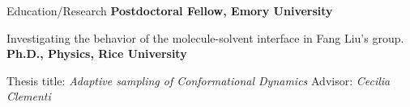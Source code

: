 \begin{rubric}{Education/Research}
%
	\textbf{Postdoctoral Fellow, Emory University}
  \par Investigating the behavior of the molecule-solvent interface in Fang Liu's group. 
\entry*[2014 -- 2020]%
  \textbf{Ph.D., Physics, Rice University}
  \par Thesis title: \emph{Adaptive sampling of Conformational Dynamics} Advisor: \emph{Cecilia Clementi}
\end{rubric}
